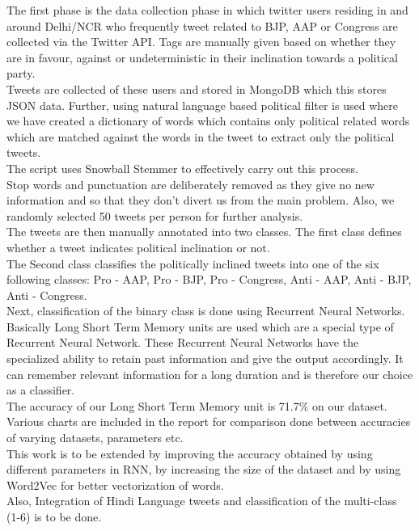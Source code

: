 \documentclass[a4paper,11pt]{article}
\begin{document}
The first phase is the data collection phase in which twitter users residing in and around Delhi/NCR who frequently tweet related to BJP, AAP or Congress are collected via the Twitter API. Tags are manually given based on whether they are in favour, against or undeterministic in their inclination towards a political party. 
\medskip\\
Tweets are collected of these users and stored in MongoDB which this stores JSON data. 
Further, using natural language based political filter is used where we have created a dictionary of words which contains only political related words which are matched against the words in the tweet to extract only the political tweets.\\
The script uses Snowball Stemmer to effectively carry out this process.\\
Stop words and punctuation are deliberately removed as they give no new information and so that they don't divert us from the main problem.
Also, we randomly selected 50 tweets per person for further analysis.
\medskip\\
The tweets are then manually annotated into two classes. The first class defines whether a tweet indicates political inclination or not.\\
The Second class classifies the politically inclined tweets into one of the six following classes: Pro - AAP, Pro - BJP, Pro - Congress, Anti - AAP, Anti - BJP, Anti - Congress.
\medskip\\
Next, classification of the binary class is done using Recurrent Neural Networks. Basically Long Short Term Memory units are used which are a special type of Recurrent Neural Network. These Recurrent Neural Networks have the specialized ability to retain past information and give the output accordingly. It can remember relevant information for a long duration and is therefore our choice as a classifier.
\medskip\\
The accuracy of our Long Short Term Memory unit is 71.7\% on our dataset. Various charts are included in the report for comparison done between accuracies of varying datasets, parameters etc.
\medskip\\
This work is to be extended by improving the accuracy obtained by using different parameters in RNN, by increasing the size of the dataset and by using Word2Vec for better vectorization of words.\\
Also, Integration of Hindi Language tweets and classification of the multi-class (1-6) is to be done.
\end{document}
